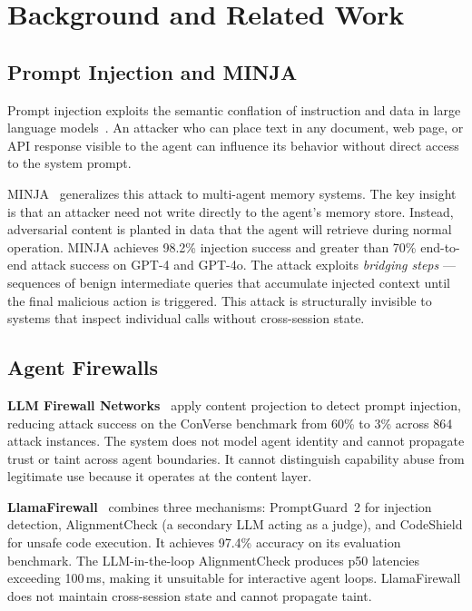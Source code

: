 \documentclass[conference]{IEEEtran}
\begin{document}
\section{Background and Related Work}
\label{sec:background}

\subsection{Prompt Injection and MINJA}

Prompt injection exploits the semantic conflation of instruction and data
in large language models~\cite{perez2022}. An attacker who can place
text in any document, web page, or API response visible to the agent can
influence its behavior without direct access to the system prompt.

MINJA~\cite{minja2025} generalizes this attack to multi-agent memory
systems. The key insight is that an attacker need not write directly to
the agent's memory store. Instead, adversarial content is planted in data
that the agent will retrieve during normal operation. MINJA achieves
98.2\% injection success and greater than 70\% end-to-end attack success
on GPT-4 and GPT-4o. The attack exploits \emph{bridging steps} ---
sequences of benign intermediate queries that accumulate injected context
until the final malicious action is triggered. This attack is structurally
invisible to systems that inspect individual calls without cross-session
state.

\subsection{Agent Firewalls}

\textbf{LLM Firewall Networks}~\cite{llmfirewall2025} apply content
projection to detect prompt injection, reducing attack success on the
ConVerse benchmark from 60\% to 3\% across 864 attack instances. The
system does not model agent identity and cannot propagate trust or taint
across agent boundaries. It cannot distinguish capability abuse from
legitimate use because it operates at the content layer.

\textbf{LlamaFirewall}~\cite{llamafirewall2025} combines three mechanisms:
PromptGuard~2 for injection detection, AlignmentCheck (a secondary LLM
acting as a judge), and CodeShield for unsafe code execution. It achieves
97.4\% accuracy on its evaluation benchmark. The LLM-in-the-loop
AlignmentCheck produces p50 latencies exceeding 100\,ms, making it
unsuitable for interactive agent loops. LlamaFirewall does not maintain
cross-session state and cannot propagate taint.
\end{document}

